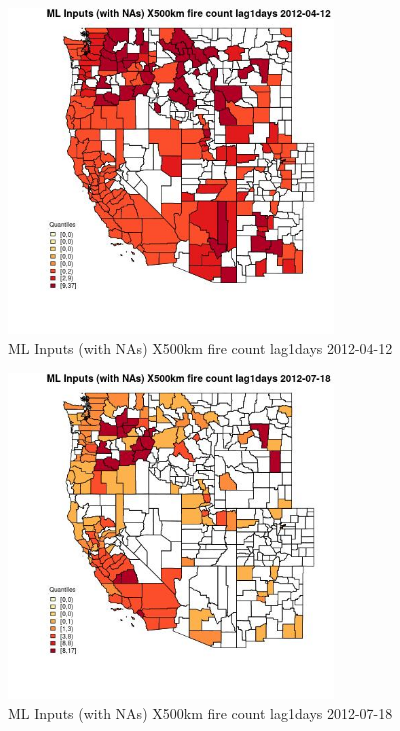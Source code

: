 \begin{figure} 
\centering  
\includegraphics[width=0.77\textwidth]{Code_Outputs/Report_ML_input_PM25_Step4_part_e_de_duplicated_aves_compiled_2019-05-14wNAs_CountyX500km_fire_count_lag1daysMean2012-04-12_2012-04-12.jpg} 
\caption{\label{fig:Report_ML_input_PM25_Step4_part_e_de_duplicated_aves_compiled_2019-05-14wNAsCountyX500km_fire_count_lag1daysMean2012-04-12_2012-04-12}ML Inputs (with NAs) X500km fire count lag1days 2012-04-12} 
\end{figure} 
 

\begin{figure} 
\centering  
\includegraphics[width=0.77\textwidth]{Code_Outputs/Report_ML_input_PM25_Step4_part_e_de_duplicated_aves_compiled_2019-05-14wNAs_CountyX500km_fire_count_lag1daysMean2012-07-18_2012-07-18.jpg} 
\caption{\label{fig:Report_ML_input_PM25_Step4_part_e_de_duplicated_aves_compiled_2019-05-14wNAsCountyX500km_fire_count_lag1daysMean2012-07-18_2012-07-18}ML Inputs (with NAs) X500km fire count lag1days 2012-07-18} 
\end{figure} 
 

